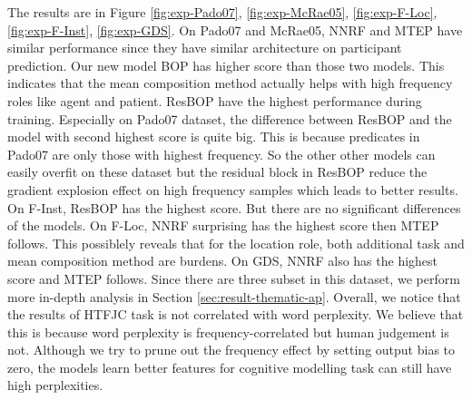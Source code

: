 \documentclass[a4paper]{article}
\begin{document}
The results are in Figure \ref{fig:exp-Pado07}, \ref{fig:exp-McRae05}, \ref{fig:exp-F-Loc}, \ref{fig:exp-F-Inst}, \ref{fig:exp-GDS}. On Pado07 and McRae05, NNRF and MTEP have similar performance since they have similar architecture on participant prediction. Our new model BOP has higher score than those two models. This indicates that the mean composition method actually helps with high frequency roles like agent and patient. ResBOP have the highest performance during training. Especially on Pado07 dataset, the difference between ResBOP and the model with second highest score is quite big. This is because predicates in Pado07 are only those with highest frequency. So the other other models can easily overfit on these dataset but the residual block in ResBOP reduce the gradient explosion effect on high frequency samples which leads to better results. On F-Inst, ResBOP has the highest score. But there are no significant differences of the models. On F-Loc, NNRF surprising has the highest score then MTEP follows. This possiblely reveals that for the location role, both additional task and mean composition method are burdens. On GDS, NNRF also has the highest score and MTEP follows. Since there are three subset in this dataset, we perform more in-depth analysis in Section \ref{sec:result-thematic-ap}. Overall, we notice that the results of HTFJC task is not correlated with word perplexity. We believe that this is because word perplexity is frequency-correlated but human judgement is not. Although we try to prune out the frequency effect by setting output bias to zero, the models learn better features for cognitive modelling task can still have high perplexities.
\end{document}
